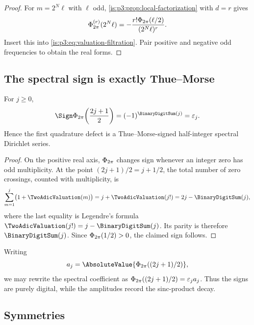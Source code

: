 \begin{proof}
For $m=2^N\ell$ with $\ell$ odd, \cref{is:p3:prop:local-factorization} with $d=r$ gives
\begin{equation}
 \Phi_{2\pi}^{(r)}(2^N\ell)
 =-\frac{r!\Phi_{2\pi}(\ell/2)}{(2^N\ell)^r}.
 \label{is:p3:eq:first-zero-jet}
\end{equation}
Insert this into \eqref{is:p3:eq:valuation-filtration}.  Pair positive and negative odd frequencies to obtain the real forms.
\end{proof}

\subsection{The spectral sign is exactly Thue--Morse}

\begin{proposition}
\label{is:p3:prop:half-integer-sign}
For $j\ge0$,
\begin{equation}
 \Sign\PhiCyc\!\left(\frac{2j+1}{2}\right)
 =(-1)^{\BinaryDigitSum(j)}=\eps_j.
 \label{is:p3:eq:half-integer-sign}
\end{equation}
Hence the first quadrature defect is a Thue--Morse-signed half-integer spectral Dirichlet series.
\end{proposition}

\begin{proof}
On the positive real axis, $\Phi_{2\pi}$ changes sign whenever an integer zero has odd multiplicity.  At the point $(2j+1)/2=j+1/2$, the total number of zero crossings, counted with multiplicity, is
\[
 \sum_{m=1}^{j}\bigl(1+\TwoAdicValuation(m)\bigr)
 =j+\TwoAdicValuation(j!)
 =2j-\BinaryDigitSum(j),
\]
where the last equality is Legendre's formula
$\TwoAdicValuation(j!)=j-\BinaryDigitSum(j)$.  Its parity is therefore
$\BinaryDigitSum(j)$.  Since $\Phi_{2\pi}(1/2)>0$, the claimed sign follows.
\end{proof}

Writing
\begin{equation}
 a_j=\AbsoluteValue{\PhiCyc((2j+1)/2)},
 \label{is:p3:eq:half-amplitudes}
\end{equation}
we may rewrite the spectral coefficient as $\Phi_{2\pi}((2j+1)/2)=\varepsilon_ja_j$.  Thus the signs are purely digital, while the amplitudes record the sinc-product decay.

\subsection{Symmetries}

